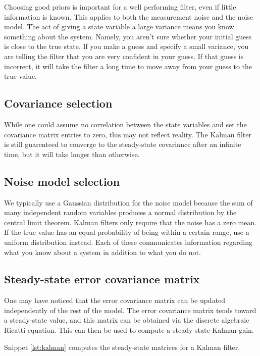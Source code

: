Choosing good priors is important for a well performing filter, even if little
information is known. This applies to both the measurement noise and the noise
\gls{model}. The act of giving a state variable a large variance means you know
something about the system. Namely, you aren't sure whether your initial guess
is close to the true state. If you make a guess and specify a small variance,
you are telling the filter that you are very confident in your guess. If that
guess is incorrect, it will take the filter a long time to move away from your
guess to the true value.

\subsection{Covariance selection}

While one could assume no correlation between the state variables and set the
covariance matrix entries to zero, this may not reflect reality. The Kalman
filter is still guarenteed to converge to the steady-state covariance after an
infinite time, but it will take longer than otherwise.

\subsection{Noise model selection}

We typically use a Gaussian distribution for the noise \gls{model} because the
sum of many independent random variables produces a normal distribution by the
central limit theorem. Kalman filters only require that the noise has a zero
mean. If the true value has an equal probability of being within a certain
range, use a uniform distribution instead. Each of these communicates
information regarding what you know about a system in addition to what you do
not.

\subsection{Steady-state error covariance matrix}

One may have noticed that the error covariance matrix can be updated
independently of the rest of the model. The error covariance matrix tends
toward a steady-state value, and this matrix can be obtained via the discrete
algebraic Ricatti equation. This can then be used to compute a steady-state
Kalman gain.

Snippet \ref{lst:kalman} computes the steady-state matrices for a Kalman
filter.

